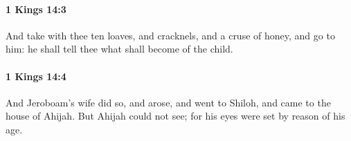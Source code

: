 		\paragraph{1 Kings 14:3} %
			\label{1KINGS-14-3}

			And take with thee ten loaves, and cracknels, and a cruse of honey, and go to him: he shall tell thee what shall become of the child.


		\paragraph{1 Kings 14:4} %
			\label{1KINGS-14-4}

			And Jeroboam’s wife did so, and arose, and went to Shiloh, and came to the house of Ahijah. But Ahijah could not see; for his eyes were set by reason of his age.


